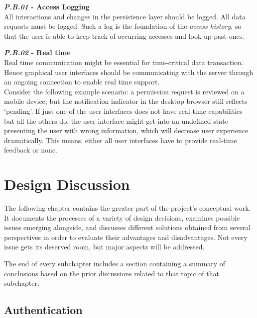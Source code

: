 \documentclass[12pt,english,a4paper,titlepage,cleardoublepage=empty,dottedtoc]{report}
\begin{document}
\textbf{\emph{\protect\hypertarget{pb01}{}{P.B.01}} - Access Logging}\\
All interactions and changes in the persistence layer should be logged.
All data requests must be logged. Such a log is the foundation of the
\emph{access history}, so that the user is able to keep track of
occurring accesses and look up past ones.

\textbf{\emph{\protect\hypertarget{pb02}{}{P.B.02}} - Real time}\\
Real time communication might be essential for time-critical data
transaction. Hence graphical user interfaces should be communicating
with the server through an ongoing connection to enable real time
support.\\
Consider the following example scenario: a permission request is
reviewed on a mobile device, but the notification indicator in the
desktop browser still reflects `pending'. If just one of the user
interfaces does not have real-time capabilities but all the others do,
the user interface might get into an undefined state presenting the user
with wrong information, which will decrease user experience
dramatically. This means, either all user interfaces have to provide
real-time feedback or none.

\hypertarget{design-discussion}{\chapter{Design
Discussion}\label{design-discussion}}

The following chapter contains the greater part of the project's
conceptual work. It documents the processes of a variety of design
decisions, examines possible issues emerging alongside, and discusses
different solutions obtained from several perspectives in order to
evaluate their advantages and disadvantages. Not every issue gets its
deserved room, but major aspects will be addressed.

The end of every subchapter includes a section containing a summary of
conclusions based on the prior discussions related to that topic of that
subchapter.

\hypertarget{authentication}{\section{Authentication}\label{authentication}}
\end{document}
